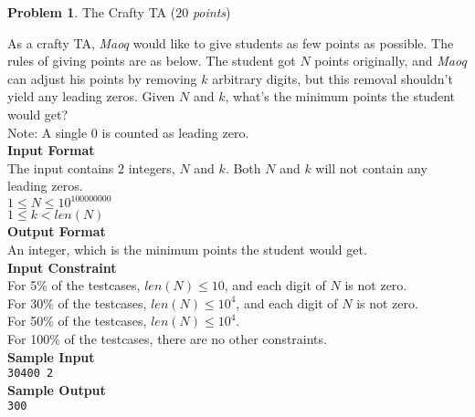 \documentclass[12pt,a4paper]{report}
\newcommand{\points}[1]{ ($#1$ \textit{points}) }
\theoremstyle{definition}
\newtheorem{problem}{\textbf{Problem}}
\theoremstyle{definition}
\begin{document}
\begin{problem}The Crafty TA \points{20}

As a crafty TA, \textit{Maoq} would like to give students as few points as possible. The rules of giving points are as below.
The student got $N$ points originally, and \textit{Maoq} can adjust his points by removing $k$ arbitrary digits, but this removal shouldn't yield any leading zeros. Given $N$ and $k$, what's the minimum points the student would get?\\
Note: A single \(0\) is counted as leading zero.\\

\textbf{\large Input Format}\\
The input contains $2$ integers, $N$ and $k$. Both $N$ and $k$ will not contain any leading zeros.\\
$1\leq N\leq 10^{100000000}$\\
$1\leq k<len(N)$\\

\textbf{\large Output Format}\\
An integer, which is the minimum points the student would get.\\

\textbf{\large Input Constraint}\\
For 5\% of the testcases, $len(N)\leq 10$, and each digit of $N$ is not zero.\\
For 30\% of the testcases, $len(N)\leq 10^4$, and each digit of $N$ is not zero.\\
For 50\% of the testcases, $len(N)\leq 10^4$.\\
For 100\% of the testcases, there are no other constraints.\\

\textbf{\large Sample Input}\\
\texttt{30400 2}\\

\textbf{\large Sample Output}\\
\texttt{300}\\
\end{problem}
\end{document}
